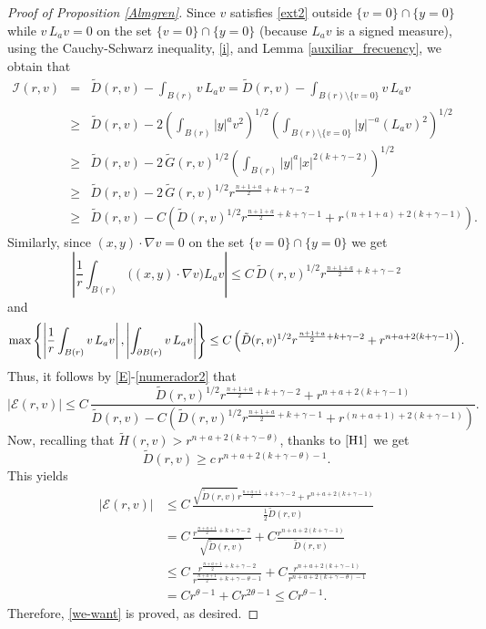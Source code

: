 \documentclass[11pt]{amsart}
\theoremstyle{plain}
\numberwithin{equation}{section}
\begin{document}
\begin{proof}[Proof of Proposition \ref{Almgren}]
Since $v$ satisfies \eqref{ext2} outside $\{v=0\}\cap \{y=0\}$ while $v\,L_av=0$ on the set $\{v=0\}\cap \{y=0\}$
(because $L_av$ is a signed measure),
using the Cauchy-Schwarz inequality, \eqref{i}, and Lemma \ref{auxiliar_frecuency}, we obtain that
\begin{eqnarray}
\mathcal{I}(r,v)&=&\tilde{D}(r,v)-\int_{B(r)} v\,L_av =\tilde{D}(r,v)-\int_{{B(r)}\setminus \{v=0\}} v\,L_av\nonumber\\
&\geq& \tilde{D}(r,v)-2\left(\int_{B(r)}{|y|^{a} v^2}\right)^{1/2}\left(\int_{{B(r)}\setminus \{v=0\}}{|y|^{-a}\left(L_av\right)^2}\right)^{1/2}\label{milveces}\\
&\geq& \tilde{D}(r,v)-2\,\tilde{G}(r,v)^{1/2}\left(\int_{B(r)}{|y|^{a}|x|^{2(k+\gamma-2)}}\right)^{1/2}\nonumber\\
&\geq& \tilde{D}(r,v)-2\,\tilde{G}(r,v)^{1/2}r^{\frac{n+1+a}{2}+k+\gamma-2}\nonumber\\
&\geq& \tilde{D}(r,v)
-C\left(\tilde{D}(r,v)^{1/2}r^{\frac{n+1+a}{2}+k+\gamma-1}+r^{(n+1+a)+2(k+\gamma-1)}\right).  \label{denominator}
\end{eqnarray}
Similarly, since $(x,y)\cdot\nabla v=0$ on the set $\{v=0\}\cap \{y=0\}$ we get
\begin{equation}\label{numerador1}
\left|\frac{1}{r}\int_{B(r)}{\bigl((x,y)\cdot\nabla v\bigr)L_a v}\right|
    \leq C\, \tilde{D}(r,v)^{1/2} r^{\frac{n+1+a}{2}+k+\gamma-2}
\end{equation}
and
\begin{equation}\label{numerador2}
\max\left\{\left|\frac{1}{r}\int_{B(r)} v\, L_av\right|, \left|\int_{\partial {B(r)}}{v\,L_av}\right|\right\}
    \leq C\, \Bigl(\tilde{D}(r,v)^{1/2} r^{\frac{n+1+a}{2}+k+\gamma-2}+r^{n+a+2(k+\gamma-1)}\Bigr).
\end{equation}
Thus, it follows by \eqref{E}-\eqref{numerador2} that
\[|\mathcal{E}(r,v)| \leq C\,
\frac{ \tilde{D}(r,v)^{1/2}r^{\frac{n+1+a}{2}+k+\gamma-2}+r^{n+a+2(k+\gamma-1)} }{ \tilde{D}(r,v)-C\left(\tilde{D}(r,v)^{1/2}r^{\frac{n+1+a}{2}+k+\gamma-1}+r^{(n+a+1)+2(k+\gamma-1)}\right)}.\]
Now, recalling that $\tilde{H}(r,v)>r^{n+a+2(k+\gamma-\theta)}$,
thanks to $\eqref{H1}$ we get
\[\tilde{D}(r,v)\geq c \,r^{n+a+2(k+\gamma-\theta)-1}.\]
This yields
\[\begin{split}
|\mathcal{E}(r,v)|&\leq C\,\frac{\sqrt{\tilde{D}(r,v)}r^{\frac{n+a+1}{2}+k+\gamma-2}+r^{n+a+2(k+\gamma-1)}}{\frac12 \tilde{D}(r,v)}\\
&= C\,\frac{r^{\frac{n+a+1}{2}+k+\gamma-2}}{\sqrt{\tilde{D}(r,v)}}+ C\frac{r^{n+a+2(k+\gamma-1)}}{\tilde{D}(r,v)}\\
&\leq C\,\frac{r^{\frac{n+a+1}{2}+k+\gamma-2}}{r^{\frac{n+a+1}{2}+k+\gamma-\theta-1}}+ C\frac{r^{n+a+2(k+\gamma-1)}}{r^{n+a+2(k+\gamma-\theta)-1}}\\
&=Cr^{\theta-1}+Cr^{2\theta-1}\leq Cr^{\theta-1}.
\end{split}\]
Therefore, \eqref{we-want} is proved, as desired.
\end{proof}
\end{document}

